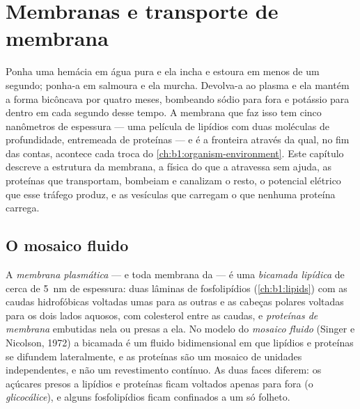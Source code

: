 \chapter{Membranas e transporte de membrana}\label{ch:b1:membranes-transport}

Ponha uma hemácia em água pura e ela incha e estoura em menos de um
segundo; ponha-a em salmoura e ela murcha. Devolva-a ao plasma e ela
mantém a forma bicôncava por quatro meses, bombeando sódio para fora e
potássio para dentro em cada segundo desse tempo. A membrana que faz
isso tem cinco nanômetros de espessura --- uma película de lipídios com
duas moléculas de profundidade, entremeada de proteínas --- e é a
fronteira através da qual, no fim das contas, acontece cada troca do
\cref{ch:b1:organism-environment}. Este capítulo descreve a estrutura da
membrana, a física do que a atravessa sem ajuda, as proteínas que
transportam, bombeiam e canalizam o resto, o potencial elétrico que esse
tráfego produz, e as vesículas que carregam o que nenhuma proteína
carrega.

\section{O mosaico fluido}

\begin{definition}\label{def:b1:membranes-transport:membrane}
A \emph{membrana plasmática} --- e toda
membrana da  --- é uma
\emph{bicamada lipídica} de cerca de
\qty{5}{nm} de espessura: duas lâminas de fosfolipídios
(\cref{ch:b1:lipids}) com as caudas hidrofóbicas voltadas umas para as
outras e as cabeças polares voltadas para os dois lados aquosos, com
colesterol entre as caudas, e
\emph{proteínas de membrana} embutidas nela
ou presas a ela. No modelo do
\emph{mosaico fluido} (Singer e
Nicolson, 1972) a bicamada é um fluido bidimensional em que lipídios e
proteínas se difundem lateralmente, e as proteínas são um mosaico de
unidades independentes, e não um revestimento contínuo. As duas faces
diferem: os açúcares presos a lipídios e proteínas ficam voltados apenas
para fora (o \emph{glicocálice}), e alguns fosfolipídios ficam confinados
a um só folheto.
\end{definition}

